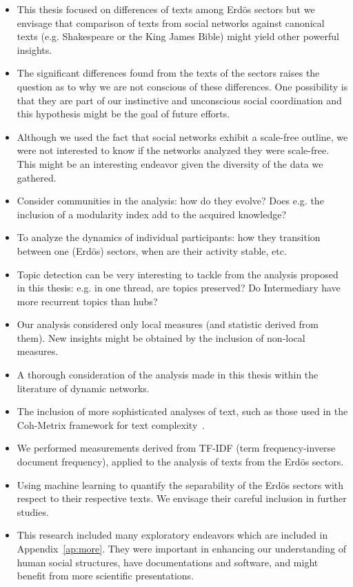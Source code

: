 \begin{itemize}
\item This thesis focused on differences of texts among Erd\"os sectors but we envisage that comparison of texts from social networks against canonical texts (e.g. Shakespeare or the King James Bible) might yield other powerful insights.
\item The significant differences found from the texts of the sectors raises the question as to why we are not conscious of these differences.
One possibility is that they are part of our instinctive and unconscious social coordination and this hypothesis might be the goal of future efforts.
\item Although we used the fact that social networks exhibit a scale-free outline,
	we were not interested to know if the networks analyzed they were scale-free.
		This might be an interesting endeavor given the diversity of the data we gathered.
\item Consider communities in the analysis: how do they evolve? Does e.g. the inclusion of a modularity index add to the acquired knowledge?
\item To analyze the dynamics of individual participants: how they transition between one (Erdös) sectors, when are their activity stable, etc.
\item Topic detection can be very interesting to tackle from the analysis proposed in this thesis:
	e.g. in one thread, are topics preserved? Do Intermediary have more recurrent topics than hubs?
\item Our analysis considered only local measures (and statistic derived from them).
	New insights might be obtained by the inclusion of non-local measures.
\item A thorough consideration of the analysis made in this thesis within the literature of dynamic networks.
\item The inclusion of more sophisticated analyses of text, such as those used in the Coh-Metrix framework for text complexity~\cite{coh}.
\item We performed measurements derived from TF-IDF (term frequency-inverse document frequency),
	applied to the analysis of texts from the Erd\"os sectors.
\item Using machine learning to quantify the separability of the Erdös sectors with respect to their respective texts.
		We envisage their careful inclusion in further studies.
	\item This research included many exploratory endeavors which are included in Appendix~\ref{ap:more}.
		They were important in enhancing our understanding of human social structures,
		have documentations and software, and might benefit from more scientific presentations.


\end{itemize}
